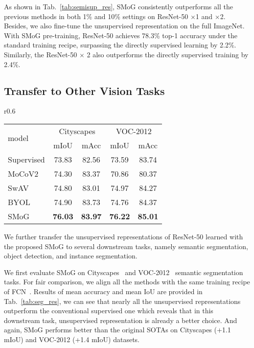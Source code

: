 \documentclass[runningheads]{style/llncs}
\begin{document}
As shown in Tab.~\ref{tab:semisup_res}, SMoG consistently outperforms all the previous methods in both 1\% and 10\% settings on ResNet-50 $\times$1 and $\times$2. Besides, we also fine-tune the unsupervised representation on the full ImageNet. With SMoG pre-training, ResNet-50 achieves 78.3\% top-1 accuracy under the standard training recipe, surpassing the directly supervised learning by 2.2\%. Similarly, the ResNet-50 $\times$ 2 also outperforms the directly supervised training by 2.4\%.

\subsection{Transfer to Other Vision Tasks}
\begin{wraptable}[12]{r}{0.6\linewidth}
	\vspace{-0.35in}
	\caption{Transfer learning results on semantic segmentation task. We fine-tune the representations on VOC2012 and Cityscapes dataset. The segmentation model is FCN with ResNet-50.}
	\small
\centering
	\setlength\arrayrulewidth{0.8pt}
\begin{tabular}{l|cc|cc}
		\multirow{2}{*}{model} & \multicolumn{2}{c|}{Cityscapes}&\multicolumn{2}{c}{VOC-2012}\\
		& mIoU & mAcc & mIoU & mAcc \\
		\hline
		Supervised & 73.83 & 82.56 & 73.59 & 83.74 \\
		MoCoV2 & 74.30 & 83.37 & 70.86 & 80.37 \\
		SwAV & 74.80 & 83.01 & 74.97 & 84.27\\
		BYOL & 74.90 & 83.73 & 74.76 & 84.37\\
		\rowcolor[gray]{0.95} SMoG & \textbf{76.03} & \textbf{83.97} & \textbf{76.22} & \textbf{85.01}\\
		
	\end{tabular}\label{tab:seg_res}
\end{wraptable}
We further transfer the unsupervised representations of ResNet-50 learned with the proposed SMoG to several downstream tasks, namely semantic segmentation, object detection, and instance segmentation.

We first evaluate SMoG on Cityscapes~\cite{cityscapes} and VOC-2012~\cite{voc} semantic segmentation tasks. For fair comparison, we align all the methods with the same training recipe of FCN~\cite{fcn}. Results of mean accuracy and mean IoU are provided in Tab.~\ref{tab:seg_res}, we can see that nearly all the unsupervised representations outperform the conventional supervised one which reveals that in this downstream task, unsupervised representation is already a better choice. And again, SMoG performs better than the original SOTAs on Cityscapes (+1.1 mIoU) and VOC-2012 (+1.4 mIoU) datasets.
\end{document}

